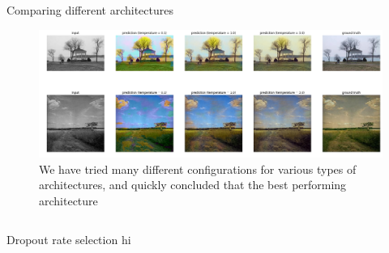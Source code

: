 \documentclass[final]{beamer}
\newlength{\onecolwid}
\newlength{\twocolwid}
\begin{document}
\begin{frame}[t]
\begin{columns}[t]
\begin{column}{\twocolwid}
\begin{block}{Comparing different architectures}
  \begin{figure}
  \begin{center}
  \includegraphics[width=.8\twocolwid]{img/better}
  \caption{We have tried many different configurations for various types of architectures, and quickly concluded that the best performing architecture}
  \label{good}
  \end{center}
  \end{figure}

  \end{block}



%
%


\begin{columns}[t,totalwidth=\twocolwid] %

\begin{column}{\onecolwid} %


\begin{block}{Dropout rate selection}
hi
\end{block}



\end{column}
\end{columns}
\end{column}
\end{columns}
\end{frame}
\end{document}

